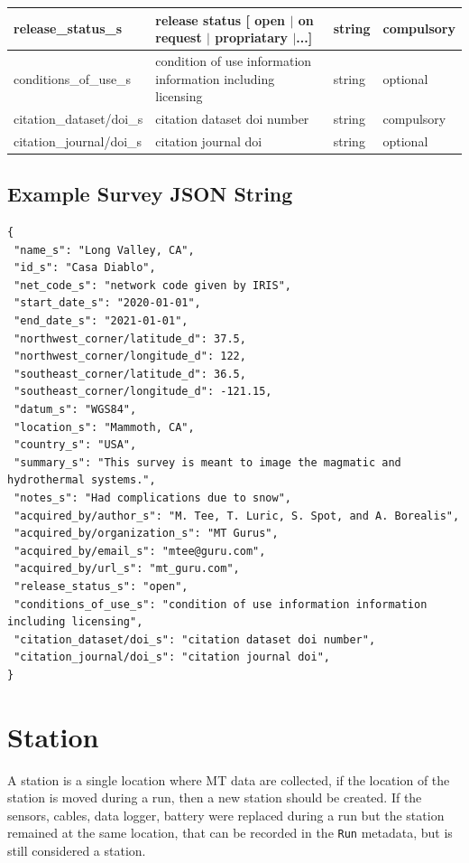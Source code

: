 \documentclass{article}
\begin{document}
\begin{table}[htb!]
\begin{tabular}{|l|l|l|l|}
		release\_status\_s & release status [ open $|$ on request $|$ propriatary $|$...] & string & compulsory \\ \hline
		conditions\_of\_use\_s & condition of use information information including licensing & string & optional \\ \hline
		citation\_dataset/doi\_s & citation dataset doi number & string & compulsory \\ \hline
		citation\_journal/doi\_s & citation journal doi & string & optional \\ \hline
	\end{tabular}
	\label{tab:survey}
\end{table} 

\newpage
\subsection{Example Survey JSON String}

\begin{verbatim}
{
 "name_s": "Long Valley, CA",
 "id_s": "Casa Diablo",
 "net_code_s": "network code given by IRIS",
 "start_date_s": "2020-01-01",
 "end_date_s": "2021-01-01",
 "northwest_corner/latitude_d": 37.5,
 "northwest_corner/longitude_d": 122,
 "southeast_corner/latitude_d": 36.5,
 "southeast_corner/longitude_d": -121.15,
 "datum_s": "WGS84",
 "location_s": "Mammoth, CA",
 "country_s": "USA",
 "summary_s": "This survey is meant to image the magmatic and hydrothermal systems.",
 "notes_s": "Had complications due to snow",
 "acquired_by/author_s": "M. Tee, T. Luric, S. Spot, and A. Borealis",
 "acquired_by/organization_s": "MT Gurus",
 "acquired_by/email_s": "mtee@guru.com",
 "acquired_by/url_s": "mt_guru.com",
 "release_status_s": "open",
 "conditions_of_use_s": "condition of use information information including licensing",
 "citation_dataset/doi_s": "citation dataset doi number",
 "citation_journal/doi_s": "citation journal doi",
}
\end{verbatim}

\newpage
\section{Station}

A station is a single location where MT data are collected, if the location of the station is moved during a run, then a new station should be created. If the sensors, cables, data logger, battery were replaced during a run but the station remained at the same location, that can be recorded in the \verb|Run| metadata, but is still considered a station.
\end{document}
